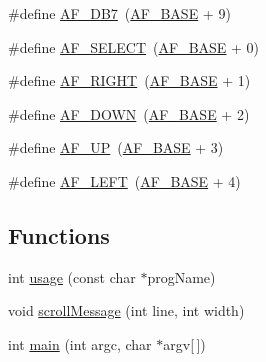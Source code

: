 \begin{DoxyCompactItemize}
\item 
\#define \hyperlink{lcd-adafruit_8c_af515b9d2e14df7e2ded2f8fdc652d5ae}{A\-F\-\_\-\-D\-B7}~(\hyperlink{lcd-adafruit_8c_a710181a64fa5dc36dc1ae8186ec077d0}{A\-F\-\_\-\-B\-A\-S\-E} +  9)
\item 
\#define \hyperlink{lcd-adafruit_8c_aaa083916b088e33272057f65be85f545}{A\-F\-\_\-\-S\-E\-L\-E\-C\-T}~(\hyperlink{lcd-adafruit_8c_a710181a64fa5dc36dc1ae8186ec077d0}{A\-F\-\_\-\-B\-A\-S\-E} +  0)
\item 
\#define \hyperlink{lcd-adafruit_8c_a71d76cd73f9c3f4e0316039bb5669b76}{A\-F\-\_\-\-R\-I\-G\-H\-T}~(\hyperlink{lcd-adafruit_8c_a710181a64fa5dc36dc1ae8186ec077d0}{A\-F\-\_\-\-B\-A\-S\-E} +  1)
\item 
\#define \hyperlink{lcd-adafruit_8c_a1ba355ad1aa22d1365d51fea1b418548}{A\-F\-\_\-\-D\-O\-W\-N}~(\hyperlink{lcd-adafruit_8c_a710181a64fa5dc36dc1ae8186ec077d0}{A\-F\-\_\-\-B\-A\-S\-E} +  2)
\item 
\#define \hyperlink{lcd-adafruit_8c_abe4c463178cda75603a48259c7e14bc3}{A\-F\-\_\-\-U\-P}~(\hyperlink{lcd-adafruit_8c_a710181a64fa5dc36dc1ae8186ec077d0}{A\-F\-\_\-\-B\-A\-S\-E} +  3)
\item 
\#define \hyperlink{lcd-adafruit_8c_a91799723644325e810ad6f8065b3ffb0}{A\-F\-\_\-\-L\-E\-F\-T}~(\hyperlink{lcd-adafruit_8c_a710181a64fa5dc36dc1ae8186ec077d0}{A\-F\-\_\-\-B\-A\-S\-E} +  4)
\end{DoxyCompactItemize}
\subsection*{Functions}
\begin{DoxyCompactItemize}
\item 
int \hyperlink{lcd-adafruit_8c_a6204fbf8cb0c8773e1b70f48968c6469}{usage} (const char $\ast$prog\-Name)
\item 
void \hyperlink{lcd-adafruit_8c_a756f66af49ba3a40b236423201d8db22}{scroll\-Message} (int line, int width)
\item 
int \hyperlink{lcd-adafruit_8c_a0ddf1224851353fc92bfbff6f499fa97}{main} (int argc, char $\ast$argv\mbox{[}$\,$\mbox{]})
\end{DoxyCompactItemize}


